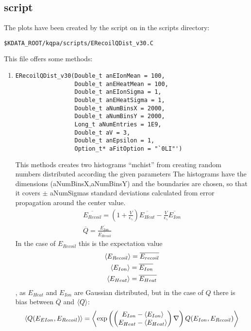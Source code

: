 \subsection{script}
The plots have been created by the script on in the scripts directory:
\begin{verbatim}
$KDATA_ROOT/kqpa/scripts/ERecoilQDist_v30.C
\end{verbatim}
This file offers some methods:
\begin{enumerate}
\item \begin{verbatim}
ERecoilQDist_v30(Double_t anEIonMean = 100,
                 Double_t anEHeatMean = 100,
                 Double_t anEIonSigma = 1,
                 Double_t anEHeatSigma = 1,
                 Double_t aNumBinsX = 2000,
                 Double_t aNumBinsY = 2000,
                 Long_t aNumEntries = 1E9,
                 Double_t aV = 3,
                 Double_t anEpsilon = 1,
                 Option_t* aFitOption = "`0LI"')
\end{verbatim}
This methods creates two histograms "`mchist"' from creating random numbers distributed according the given parameters The histograms have the dimensions (aNumBinsX,aNumBinsY) and the boundaries are chosen, so that it covers $\pm$ aNumSigmas standard deviations calculated from error propagation around the center value.
\begin{gather}
\overline{E_{Recoil}} = \left(1 + \frac{V}{\epsilon_\gamma} \right) \overline{E_{Heat}} - \frac{V}{\epsilon_\gamma} \overline{E_{Ion}} \\
\overline{Q} = \frac{\overline{E_{Ion}}}{\overline{E_{Recoil}}} 
\end{gather}
In the case of $E_{Recoil}$ this is the expectation value
\begin{gather}
\left \langle E_{Recoil} \right \rangle = \overline{E_{recoil}} \\
\left \langle E_{Ion} \right \rangle = \overline{E_{Ion}} \\
\left \langle E_{Heat} \right \rangle = \overline{E_{Heat}}
\end{gather}
, as $E_{Heat}$ and $E_{Ion}$ are Gaussian distributed, but in the case of $Q$
there is bias between $\overline{Q}$ and $\left \langle Q \right \rangle$: 
\begin{gather}
\mean{Q(E_{EIon},E_{Recoil})} = \mean{\exp \left( \begin{pmatrix} E_{Ion} - \mean{E_{Ion}} \\ E_{Heat} - \mean{E_{Heat}} \end{pmatrix} \nabla \right) Q(E_{Ion},E_{Recoil})} \\

\end{gather}
\end{enumerate}
